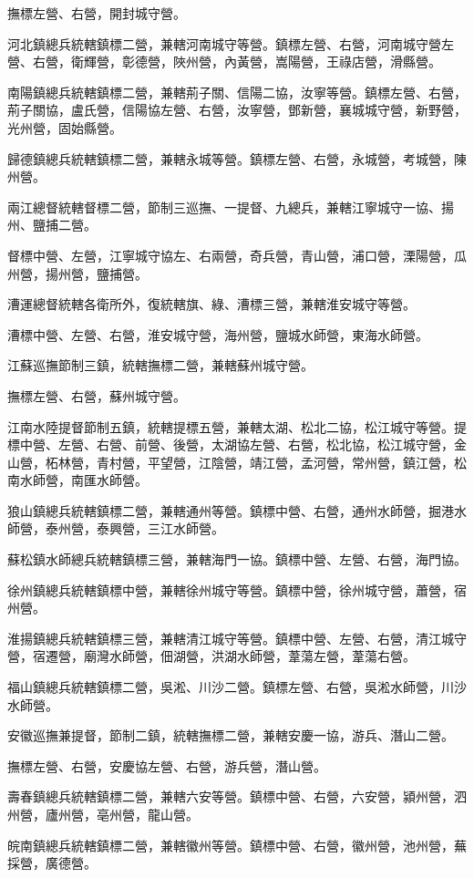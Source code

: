 \begin{pinyinscope}
撫標左營、右營，開封城守營。

河北鎮總兵統轄鎮標二營，兼轄河南城守等營。鎮標左營、右營，河南城守營左營、右營，衛輝營，彰德營，陜州營，內黃營，嵩陽營，王祿店營，滑縣營。

南陽鎮總兵統轄鎮標二營，兼轄荊子關、信陽二協，汝寧等營。鎮標左營、右營，荊子關協，盧氏營，信陽協左營、右營，汝寧營，鄧新營，襄城城守營，新野營，光州營，固始縣營。

歸德鎮總兵統轄鎮標二營，兼轄永城等營。鎮標左營、右營，永城營，考城營，陳州營。

兩江總督統轄督標二營，節制三巡撫、一提督、九總兵，兼轄江寧城守一協、揚州、鹽捕二營。

督標中營、左營，江寧城守協左、右兩營，奇兵營，青山營，浦口營，溧陽營，瓜州營，揚州營，鹽捕營。

漕運總督統轄各衛所外，復統轄旗、綠、漕標三營，兼轄淮安城守等營。

漕標中營、左營、右營，淮安城守營，海州營，鹽城水師營，東海水師營。

江蘇巡撫節制三鎮，統轄撫標二營，兼轄蘇州城守營。

撫標左營、右營，蘇州城守營。

江南水陸提督節制五鎮，統轄提標五營，兼轄太湖、松北二協，松江城守等營。提標中營、左營、右營、前營、後營，太湖協左營、右營，松北協，松江城守營，金山營，柘林營，青村營，平望營，江陰營，靖江營，孟河營，常州營，鎮江營，松南水師營，南匯水師營。

狼山鎮總兵統轄鎮標二營，兼轄通州等營。鎮標中營、右營，通州水師營，掘港水師營，泰州營，泰興營，三江水師營。

蘇松鎮水師總兵統轄鎮標三營，兼轄海門一協。鎮標中營、左營、右營，海門協。

徐州鎮總兵統轄鎮標中營，兼轄徐州城守等營。鎮標中營，徐州城守營，蕭營，宿州營。

淮揚鎮總兵統轄鎮標三營，兼轄清江城守等營。鎮標中營、左營、右營，清江城守營，宿遷營，廟灣水師營，佃湖營，洪湖水師營，葦蕩左營，葦蕩右營。

福山鎮總兵統轄鎮標二營，吳淞、川沙二營。鎮標左營、右營，吳淞水師營，川沙水師營。

安徽巡撫兼提督，節制二鎮，統轄撫標二營，兼轄安慶一協，游兵、潛山二營。

撫標左營、右營，安慶協左營、右營，游兵營，潛山營。

壽春鎮總兵統轄鎮標二營，兼轄六安等營。鎮標中營、右營，六安營，潁州營，泗州營，廬州營，亳州營，龍山營。

皖南鎮總兵統轄鎮標二營，兼轄徽州等營。鎮標中營、右營，徽州營，池州營，蕪採營，廣德營。


\end{pinyinscope}
